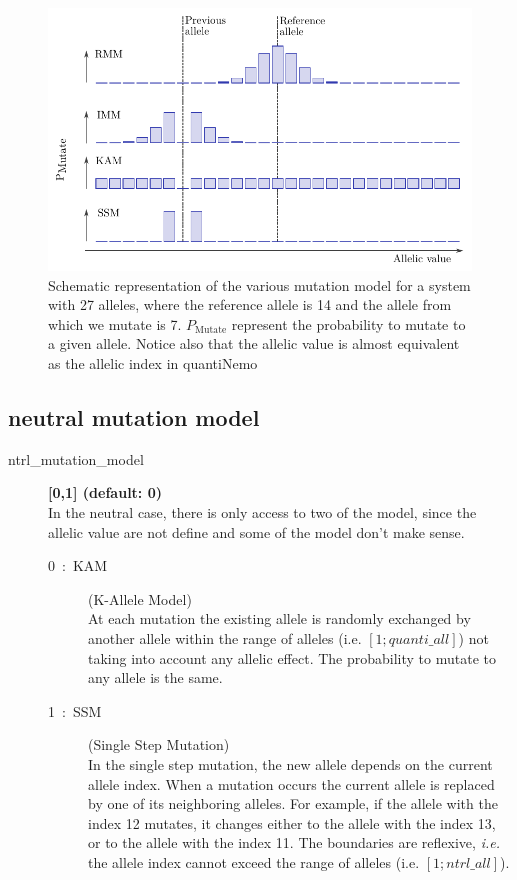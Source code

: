 \documentclass[letterpaper,12pt,oneside]{book}
\begin{document}
\begin{description}
\begin{figure}[htbp]
    \centering
        \includegraphics[width=1\textwidth]{mutation_model.pdf}
    \caption{Schematic representation of the various mutation model for a system with 27 alleles, where the reference allele is 14 and the allele from which we mutate is 7. $P_{\text{Mutate}}$ represent the probability to mutate to a given allele. Notice also that the allelic value is almost equivalent as the allelic index in quantiNemo}
    \label{fig:mutation_model}
\end{figure}

\end{description}

\subsection{neutral mutation model}
\begin{description}
\item[ntrl\_mutation\_model] \textbf{[0,1] (default: 0)}\\
In the neutral case, there is only access to two of the model, since the allelic value are not define and some of the model don't make sense. 
\begin{description}
\item[0~:~KAM] (K-Allele Model)\\
At each mutation the existing allele is randomly exchanged by another allele within the range of alleles (i.e. $[1; quanti\_all]$) not taking into account any allelic effect. The probability to mutate to any allele is the same.

\item[1~:~SSM] (Single Step Mutation)\\
In the single step mutation, the new allele depends on the current allele index. When a mutation occurs the current allele is replaced by one of its neighboring alleles. For example, if the allele with the index 12 mutates, it changes either to the allele with the index 13, or to the allele with the index 11. The boundaries are reflexive, \textit{i.e.} the allele index cannot exceed the range of alleles (i.e. $[1; ntrl\_all]$).
\end{description}
\end{description}
\end{document}

